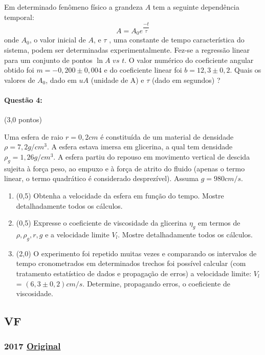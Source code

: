 \documentclass[12pt,a4paper]{article}
\newcommand{\original}[1]{\tiny \href{#1}{Original} \normalsize}
\begin{document}
Em determinado fenômeno físico a grandeza $A$ tem a seguinte dependência
temporal:
$$ A=A_0 e^{\dfrac{-t}{\tau}} $$
onde $A_0$, o valor inicial de $A$, e $\tau$ , uma constante de tempo característica do sistema, podem ser determinadas experimentalmente. Fez-se a regressão linear para um conjunto de pontos $\ln A$ $vs$ $t$.
O valor numérico do coeficiente angular obtido foi $m = -0, 200 \pm 0, 004$ e do coeficiente linear foi $b = 12, 3 \pm 0, 2$. Quais os valores de $A_0$, dado em $uA$ (unidade de A) e $\tau$ (dado em segundos) ?

\paragraph{Questão 4:} (3,0 pontos)

Uma esfera de raio $ r = 0, 2cm$ é constituída de um material de densidade
$\rho = 7, 2g/cm^3$. A esfera estava imersa em glicerina, a qual tem densidade $\rho_g = 1, 26g/cm^3$. A esfera partiu do repouso em movimento vertical de descida sujeita à força peso, ao empuxo e à força de atrito do fluido (apenas o termo linear, o termo quadrático é considerado desprezível).
Assuma $g = 980cm/s$.

\begin{enumerate}[label=(\alph*)]
\item  (0,5) Obtenha a velocidade da esfera em função do tempo. Mostre detalhadamente todos os
cálculos.
\item (0,5) Expresse o coeficiente de viscosidade da glicerina $\eta_g$ em termos de $\rho, \rho_g, r , g$ e a velocidade limite $V_l$. Mostre detalhadamente todos os cálculos.
\item (2,0) O experimento foi repetido muitas vezes e comparando os intervalos de tempo cronometrados em determinados trechos foi possível calcular (com tratamento estatístico de dados e propagação de erros) a velocidade limite: $V_l$ = $(6, 3 \pm 0, 2) cm/s$. Determine, propagando erros, o coeficiente de viscosidade.
\end{enumerate}
\newpage
\subsection{VF}
\subsubsection{2017 \original{https://drive.google.com/file/d/1Pp4yiMlwnpvGkK0ZCBaUQ2dwlppfBSf_/view?usp=sharing}}
\end{document}
